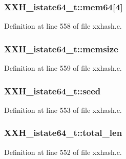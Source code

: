 \subsubsection[{mem64}]{ X\+X\+H\+\_\+istate64\+\_\+t\+::mem64\mbox{[}4\mbox{]}}\label{struct_x_x_h__istate64__t_afb9b66e9fbc5d3f51ffd0eafb869f544}


Definition at line 558 of file xxhash.\+c.

\hypertarget{struct_x_x_h__istate64__t_af785fbcec8f01e664482baea8f0be464}{}
\subsubsection[{memsize}]{ X\+X\+H\+\_\+istate64\+\_\+t\+::memsize}\label{struct_x_x_h__istate64__t_af785fbcec8f01e664482baea8f0be464}


Definition at line 559 of file xxhash.\+c.

\hypertarget{struct_x_x_h__istate64__t_a78dc60197be1a16bf99a15a85ce6e34c}{}
\subsubsection[{seed}]{ X\+X\+H\+\_\+istate64\+\_\+t\+::seed}\label{struct_x_x_h__istate64__t_a78dc60197be1a16bf99a15a85ce6e34c}


Definition at line 553 of file xxhash.\+c.

\hypertarget{struct_x_x_h__istate64__t_af12b1222f841660bef64efaae2a6a5a6}{}
\subsubsection[{total\+\_\+len}]{ X\+X\+H\+\_\+istate64\+\_\+t\+::total\+\_\+len}\label{struct_x_x_h__istate64__t_af12b1222f841660bef64efaae2a6a5a6}


Definition at line 552 of file xxhash.\+c.

